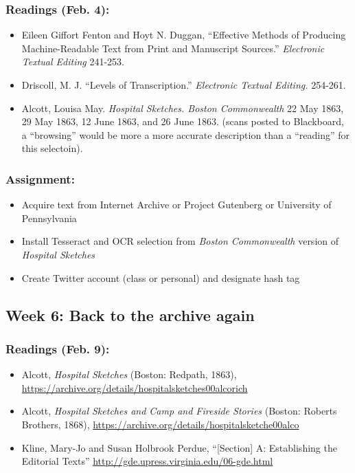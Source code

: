 \documentclass[]{article}
\begin{document}
\subsubsection{Readings (Feb. 4):}\label{readings-feb.-4}

\begin{itemize}
\itemsep1pt\parskip0pt
\item
  Eileen Giffort Fenton and Hoyt N. Duggan, ``Effective Methods of
  Producing Machine-Readable Text from Print and Manuscript Sources.''
  \emph{Electronic Textual Editing} 241-253.
\item
  Driscoll, M. J. ``Levels of Transcription.'' \emph{Electronic Textual
  Editing.} 254-261.
\item
  Alcott, Louisa May. \emph{Hospital Sketches. Boston Commonwealth} 22
  May 1863, 29 May 1863, 12 June 1863, and 26 June 1863. (scans posted
  to Blackboard, a ``browsing'' would be more a more accurate
  description than a ``reading'' for this selectoin).
\end{itemize}

\subsubsection{Assignment:}\label{assignment-3}

\begin{itemize}
\itemsep1pt\parskip0pt
\item
  Acquire text from Internet Archive or Project Gutenberg or University
  of Pennsylvania
\item
  Install Tesseract and OCR selection from \emph{Boston Commonwealth}
  version of \emph{Hospital Sketches}
\item
  Create Twitter account (class or personal) and designate hash tag
\end{itemize}

\subsection{Week 6: Back to the archive
again}\label{week-6-back-to-the-archive-again}

\subsubsection{Readings (Feb. 9):}\label{readings-feb.-9}

\begin{itemize}
\itemsep1pt\parskip0pt
\item
  Alcott, \emph{Hospital Sketches} (Boston: Redpath, 1863),
  \url{https://archive.org/details/hospitalsketches00alcorich}
\item
  Alcott, \emph{Hospital Sketches and Camp and Fireside Stories}
  (Boston: Roberts Brothers, 1868),
  \url{https://archive.org/details/hospitalsketche00alco}
\item
  Kline, Mary-Jo and Susan Holbrook Perdue, ``{[}Section{]} A:
  Establishing the Editorial Texts''
  \url{http://gde.upress.virginia.edu/06-gde.html}
\end{itemize}
\end{document}
